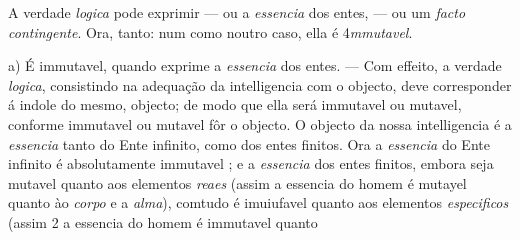 
  
A verdade \emph{logica} pode exprimir --- ou a \emph{essencia} dos entes, --- ou um \emph{facto contingente}. Ora, tanto: num como noutro caso, ella é 4\emph{mmutavel}.

a) É immutavel, quando exprime a \emph{essencia} dos entes. --- Com effeito, a verdade \emph{logica}, consistindo na adequação da intelligencia com o objecto, deve corresponder á indole do mesmo, objecto; de modo que ella será immutavel ou mutavel, conforme immutavel ou mutavel fôr o objecto. O objecto da nossa intelligencia é a \emph{essencia} tanto do Ente infinito, como dos entes finitos. Ora a \emph{essencia} do Ente infinito é absolutamente immutavel ; e a \emph{essencia} dos entes finitos, embora seja mutavel quanto aos elementos \emph{reaes} (assim a essencia do homem é mutayel quanto ào \emph{corpo} e a \emph{alma}), comtudo é imuiufavel quanto aos elementos \emph{especificos} (assim 2 a essencia do homem é immutavel quanto

